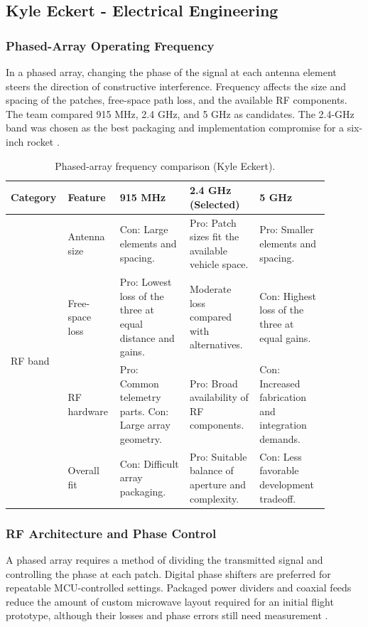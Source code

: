 \documentclass[11pt]{IEEEtran}
\begin{document}
\subsection{Kyle Eckert - Electrical Engineering}
\subsubsection{Phased-Array Operating Frequency}
In a phased array, changing the phase of the signal at each antenna element steers the direction of constructive interference. Frequency affects the size and spacing of the patches, free-space path loss, and the available RF components. The team compared 915 MHz, 2.4 GHz, and 5 GHz as candidates. The 2.4-GHz band was chosen as the best packaging and implementation compromise for a six-inch rocket \cite{phased,fcc15247}.

\begin{table}[H]
\centering\small
\begin{tabular}{@{}p{0.115\linewidth}p{0.145\linewidth}p{0.21\linewidth}p{0.21\linewidth}p{0.21\linewidth}@{}}
\toprule
\textbf{Category} & \textbf{Feature} & \textbf{915 MHz} & \textbf{2.4 GHz (Selected)} & \textbf{5 GHz} \\
\midrule
\multirow{4}{*}{RF band}
 & Antenna size & Con: Large elements and spacing. & Pro: Patch sizes fit the available vehicle space. & Pro: Smaller elements and spacing. \\ \cmidrule{2-5}
 & Free-space loss & Pro: Lowest loss of the three at equal distance and gains. & Moderate loss compared with alternatives. & Con: Highest loss of the three at equal gains. \\ \cmidrule{2-5}
 & RF hardware & Pro: Common telemetry parts. Con: Large array geometry. & Pro: Broad availability of RF components. & Con: Increased fabrication and integration demands. \\ \cmidrule{2-5}
 & Overall fit & Con: Difficult array packaging. & Pro: Suitable balance of aperture and complexity. & Con: Less favorable development tradeoff. \\
\bottomrule
\end{tabular}
\vspace{3mm}
\caption{Phased-array frequency comparison (Kyle Eckert).}
\label{tab:Frequency_Comparison}
\end{table}

\subsubsection{RF Architecture and Phase Control}
A phased array requires a method of dividing the transmitted signal and controlling the phase at each patch. Digital phase shifters are preferred for repeatable MCU-controlled settings. Packaged power dividers and coaxial feeds reduce the amount of custom microwave layout required for an initial flight prototype, although their losses and phase errors still need measurement \cite{phased,wilkinson,rfLaminate}.
\end{document}

